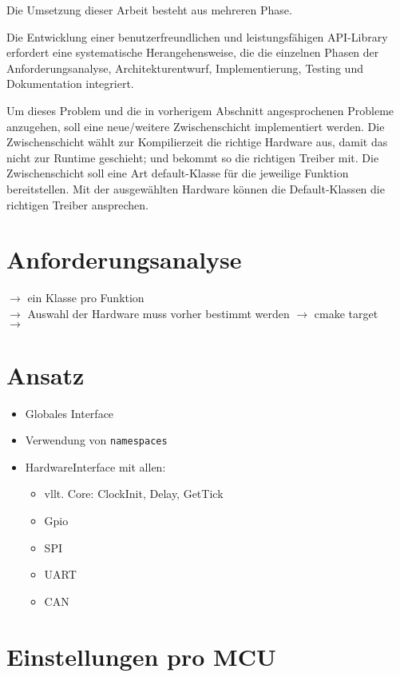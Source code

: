 Die Umsetzung dieser Arbeit besteht aus mehreren Phase.

Die Entwicklung einer benutzerfreundlichen und leistungsfähigen API-Library erfordert eine systematische Herangehensweise, die die einzelnen Phasen der Anforderungsanalyse, Architekturentwurf, Implementierung, Testing und Dokumentation integriert.
 


Um dieses Problem und die in vorherigem Abschnitt angesprochenen Probleme anzugehen, soll eine neue/weitere Zwischenschicht implementiert werden. 
Die Zwischenschicht wählt zur Kompilierzeit die richtige Hardware aus, damit das nicht zur Runtime geschieht; und bekommt so die richtigen Treiber mit.
Die Zwischenschicht soll eine Art default-Klasse für die jeweilige Funktion bereitstellen.
Mit der ausgewählten Hardware können die Default-Klassen die richtigen Treiber ansprechen.

\section{Anforderungsanalyse}
$\rightarrow$ ein Klasse pro Funktion \\
$\rightarrow$ Auswahl der Hardware muss vorher bestimmt werden $\rightarrow$ cmake target \\
$\rightarrow$  

\section{Ansatz}
\begin{itemize}
	\item Globales Interface
	\item Verwendung von \texttt{namespaces}
	\item HardwareInterface mit allen:
	\begin{itemize}
		\item vllt. Core: ClockInit, Delay, GetTick
		\item Gpio
		\item SPI
		\item UART
		\item CAN
	\end{itemize}
\end{itemize}


\section{Einstellungen pro MCU}

